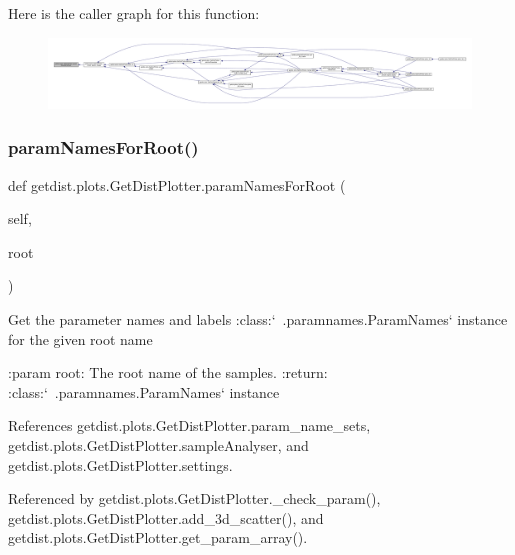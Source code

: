 Here is the caller graph for this function\+:
\nopagebreak
\begin{figure}[H]
\begin{center}
\leavevmode
\includegraphics[width=350pt]{classgetdist_1_1plots_1_1GetDistPlotter_a199664f84496268527d58072eebcd724_icgraph}
\end{center}
\end{figure}
\mbox{\label{classgetdist_1_1plots_1_1GetDistPlotter_a556fd9e8f1a884ef8673cf58e64572af}} 
\subsubsection{\texorpdfstring{param\+Names\+For\+Root()}{paramNamesForRoot()}}
{\footnotesize\ttfamily def getdist.\+plots.\+Get\+Dist\+Plotter.\+param\+Names\+For\+Root (\begin{DoxyParamCaption}\item[{}]{self,  }\item[{}]{root }\end{DoxyParamCaption})}

\begin{DoxyVerb}Get the parameter names and labels :class:`~.paramnames.ParamNames` instance for the given root name

:param root: The root name of the samples.
:return: :class:`~.paramnames.ParamNames` instance
\end{DoxyVerb}
 

References getdist.\+plots.\+Get\+Dist\+Plotter.\+param\+\_\+name\+\_\+sets, getdist.\+plots.\+Get\+Dist\+Plotter.\+sample\+Analyser, and getdist.\+plots.\+Get\+Dist\+Plotter.\+settings.



Referenced by getdist.\+plots.\+Get\+Dist\+Plotter.\+\_\+check\+\_\+param(), getdist.\+plots.\+Get\+Dist\+Plotter.\+add\+\_\+3d\+\_\+scatter(), and getdist.\+plots.\+Get\+Dist\+Plotter.\+get\+\_\+param\+\_\+array().

